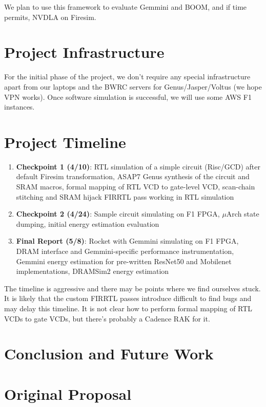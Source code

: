\documentclass[sigconf]{acmart}
\begin{document}
We plan to use this framework to evaluate Gemmini\cite{gemmini} and BOOM, and if time permits, NVDLA on Firesim\cite{nvdlafiresim}.

\section{Project Infrastructure}
For the initial phase of the project, we don't require any special infrastructure apart from our laptops and the BWRC servers for Genus/Jasper/Voltus (we hope VPN works).
Once software simulation is successful, we will use some AWS F1 instances.

\section{Project Timeline}

\begin{enumerate}
  \item \textbf{Checkpoint 1 (4/10)}: RTL simulation of a simple circuit (Risc/GCD) after default Firesim transformation, ASAP7 Genus synthesis of the circuit and SRAM macros, formal mapping of RTL VCD to gate-level VCD, scan-chain stitching and SRAM hijack FIRRTL pass working in RTL simulation
  \item \textbf{Checkpoint 2 (4/24)}: Sample circuit simulating on F1 FPGA, $\mu$Arch state dumping, initial energy estimation evaluation
  \item \textbf{Final Report (5/8)}: Rocket with Gemmini simulating on F1 FPGA, DRAM interface and Gemmini-specific performance instrumentation, Gemmini energy estimation for pre-written ResNet50 and Mobilenet implementations, DRAMSim2 energy estimation
\end{enumerate}

The timeline is aggressive and there may be points where we find ourselves stuck.
It is likely that the custom FIRRTL passes introduce difficult to find bugs and may delay this timeline.
It is not clear how to perform formal mapping of RTL VCDs to gate VCDs, but there's probably a Cadence RAK for it.


\section{Conclusion and Future Work}

\appendix
\section{Original Proposal}
\end{document}
